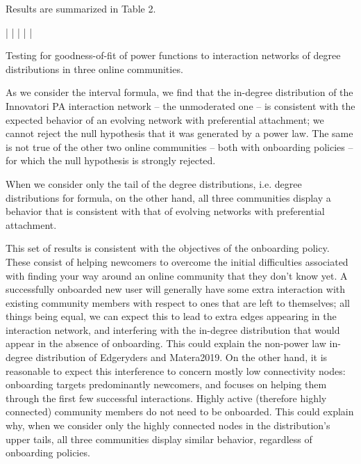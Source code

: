 Results are summarized in Table 2. 

\begin{table}{| | | | |}
\caption{Testing for goodness-of-fit of power functions to interaction networks of degree distributions in three online communities.}
\end{table}

As we consider the interval formula, we find that the in-degree distribution of the Innovatori PA interaction network – the unmoderated one – is consistent with the expected behavior of an evolving network with preferential attachment; we cannot reject the null hypothesis that it was generated by a power law. The same is not true of the other two online communities – both with onboarding policies – for which the null hypothesis is strongly rejected.  

When we consider only the tail of the degree distributions, i.e. degree distributions for formula, on the other hand, all three communities display a behavior that is consistent with that of evolving networks with preferential attachment.

This set of results is consistent with the objectives of the onboarding policy. These consist of helping newcomers to overcome the initial difficulties associated with finding your way around an online community that they don't know yet. A successfully onboarded new user will generally have some extra interaction with existing community members with respect to ones that are left to themselves; all things being equal, we can expect this to lead to extra edges appearing in the interaction network, and interfering with the in-degree distribution that would appear in the absence of onboarding. This could explain the non-power law in-degree distribution of Edgeryders and Matera2019. On the other hand, it is reasonable to expect this interference to concern mostly low connectivity nodes: onboarding targets predominantly newcomers, and focuses on helping them through the first few successful interactions. Highly active (therefore highly connected) community members do not need to be onboarded. This could explain why, when we consider only the highly connected nodes in the distribution's upper tails, all three communities display similar behavior, regardless of onboarding policies. 

